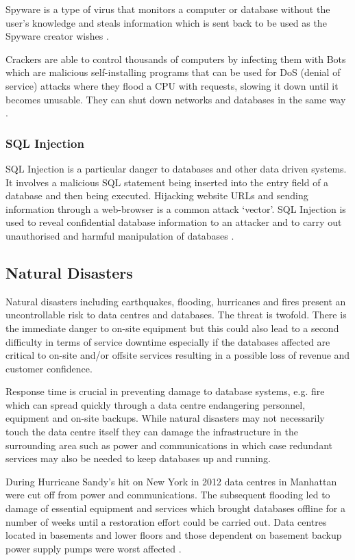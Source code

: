 \documentclass[11pt, twocolumn]{article}
\begin{document}
Spyware is a type of virus that monitors a computer or database without the user’s knowledge and steals information which is sent back to be used as the Spyware creator wishes \cite{Bas}.

Crackers are able to control thousands of computers by infecting them with Bots which are malicious self-installing programs that can be used for DoS (denial of service) attacks where they flood a CPU with requests, slowing it down until it becomes unusable.  They can shut down networks and databases in the same way \cite{Bas}.

\subsubsection{SQL Injection}
SQL Injection is a particular danger to databases and other data driven systems.  It involves a malicious SQL statement being inserted into the entry field of a database and then being executed.  Hijacking website URLs and sending information through a web-browser is a common attack ‘vector’.  SQL Injection is used to reveal confidential database information to an attacker and to carry out unauthorised and harmful manipulation of databases \cite{Bas}.

\subsection{Natural Disasters}
Natural disasters including earthquakes, flooding, hurricanes and fires present an uncontrollable risk to data centres and databases.  The threat is twofold.  There is the immediate danger to on-site equipment but this could also lead to a second difficulty in terms of service downtime especially if the databases affected are critical to on-site and/or offsite services resulting in a possible loss of revenue and customer confidence.

Response time is crucial in preventing damage to database systems, e.g. fire which can spread quickly through a data centre endangering personnel, equipment and on-site backups.  While natural disasters may not necessarily touch the data centre itself they can damage the infrastructure in the surrounding area such as power and communications in which case redundant services may also be needed to keep databases up and running.

During Hurricane Sandy’s hit on New York in 2012 data centres in Manhattan were cut off from power and communications.  The subsequent flooding led to damage of essential equipment and services which brought databases offline for a number of weeks until a restoration effort could be carried out.  Data centres located in basements and lower floors and those dependent on basement backup power supply pumps were worst affected \cite{sean4}.
\end{document}

